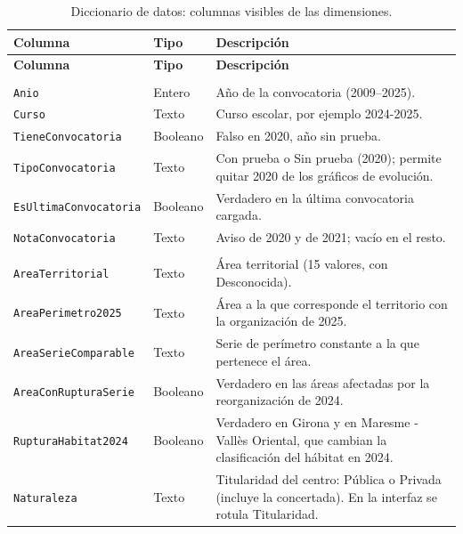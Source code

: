 \documentclass[12pt, a4paper, oneside]{report}
\begin{document}
{\small{}\renewcommand{\arraystretch}{1.1}
\begin{longtable}{@{} >{\raggedright\arraybackslash}p{4.2cm} >{\raggedright\arraybackslash}p{1.6cm} p{8.5cm} @{}}
\toprule
\textbf{Columna} & \textbf{Tipo} & \textbf{Descripción} \\ \midrule
\endfirsthead
\toprule
\textbf{Columna} & \textbf{Tipo} & \textbf{Descripción} \\ \midrule
\endhead
\bottomrule
\caption{Diccionario de datos: columnas visibles de las dimensiones.}\label{tab:diccionario}
\endlastfoot
\multicolumn{3}{@{}l}{\textit{DimAnio}} \\
\texttt{Anio} & Entero & Año de la convocatoria (2009--2025). \\
\texttt{Curso} & Texto & Curso escolar, por ejemplo \guillemotleft{}2024-2025\guillemotright{}. \\
\texttt{TieneConvocatoria} & Booleano & Falso en 2020, año sin prueba. \\
\texttt{TipoConvocatoria} & Texto & \guillemotleft{}Con prueba\guillemotright{} o \guillemotleft{}Sin prueba\guillemotright{} (2020); permite quitar 2020 de los gráficos de evolución. \\
\texttt{EsUltimaConvocatoria} & Booleano & Verdadero en la última convocatoria cargada. \\
\texttt{NotaConvocatoria} & Texto & Aviso de 2020 y de 2021; vacío en el resto. \\ \addlinespace
\multicolumn{3}{@{}l}{\textit{DimContextoCentro}} \\
\texttt{AreaTerritorial} & Texto & Área territorial (15 valores, con \guillemotleft{}Desconocida\guillemotright{}). \\
\texttt{AreaPerimetro2025} & Texto & Área a la que corresponde el territorio con la organización de 2025. \\
\texttt{AreaSerieComparable} & Texto & Serie de perímetro constante a la que pertenece el área. \\
\texttt{AreaConRupturaSerie} & Booleano & Verdadero en las áreas afectadas por la reorganización de 2024. \\
\texttt{RupturaHabitat2024} & Booleano & Verdadero en Girona y en Maresme - Vallès Oriental, que cambian la clasificación del hábitat en 2024. \\
\texttt{Naturaleza} & Texto & Titularidad del centro: Pública o Privada (incluye la concertada). En la interfaz se rotula \guillemotleft{}Titularidad\guillemotright{}. \\

\end{longtable}}
\end{document}
